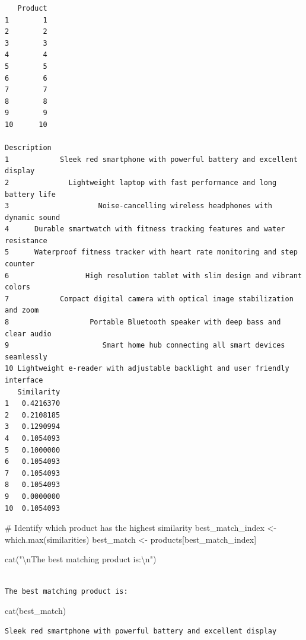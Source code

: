 \documentclass[
  letterpaper,
  DIV=11,
  numbers=noendperiod]{scrartcl}
\newenvironment{Shaded}{\begin{snugshade}}{\end{snugshade}}
\newcommand{\CommentTok}[1]{\textcolor[rgb]{0.37,0.37,0.37}{#1}}
\newcommand{\FunctionTok}[1]{\textcolor[rgb]{0.28,0.35,0.67}{#1}}
\newcommand{\NormalTok}[1]{\textcolor[rgb]{0.00,0.23,0.31}{#1}}
\newcommand{\OtherTok}[1]{\textcolor[rgb]{0.00,0.23,0.31}{#1}}
\newcommand{\SpecialCharTok}[1]{\textcolor[rgb]{0.37,0.37,0.37}{#1}}
\newcommand{\StringTok}[1]{\textcolor[rgb]{0.13,0.47,0.30}{#1}}
\begin{document}
\begin{verbatim}
   Product
1        1
2        2
3        3
4        4
5        5
6        6
7        7
8        8
9        9
10      10
                                                                  Description
1            Sleek red smartphone with powerful battery and excellent display
2              Lightweight laptop with fast performance and long battery life
3                     Noise-cancelling wireless headphones with dynamic sound
4      Durable smartwatch with fitness tracking features and water resistance
5      Waterproof fitness tracker with heart rate monitoring and step counter
6                  High resolution tablet with slim design and vibrant colors
7            Compact digital camera with optical image stabilization and zoom
8                   Portable Bluetooth speaker with deep bass and clear audio
9                      Smart home hub connecting all smart devices seamlessly
10 Lightweight e-reader with adjustable backlight and user friendly interface
   Similarity
1   0.4216370
2   0.2108185
3   0.1290994
4   0.1054093
5   0.1000000
6   0.1054093
7   0.1054093
8   0.1054093
9   0.0000000
10  0.1054093
\end{verbatim}

\begin{Shaded}
\begin{Highlighting}[]
\CommentTok{\# Identify which product has the highest similarity}
\NormalTok{best\_match\_index }\OtherTok{\textless{}{-}} \FunctionTok{which.max}\NormalTok{(similarities)}
\NormalTok{best\_match }\OtherTok{\textless{}{-}}\NormalTok{ products[best\_match\_index]}

\FunctionTok{cat}\NormalTok{(}\StringTok{"}\SpecialCharTok{\textbackslash{}n}\StringTok{The best matching product is:}\SpecialCharTok{\textbackslash{}n}\StringTok{"}\NormalTok{)}
\end{Highlighting}
\end{Shaded}

\begin{verbatim}

The best matching product is:
\end{verbatim}

\begin{Shaded}
\begin{Highlighting}[]
\FunctionTok{cat}\NormalTok{(best\_match)}
\end{Highlighting}
\end{Shaded}

\begin{verbatim}
Sleek red smartphone with powerful battery and excellent display
\end{verbatim}
\end{document}
